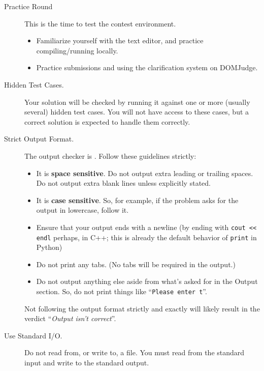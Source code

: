 \begin{description}

\item[Practice Round] This is the time to test the contest environment.
\begin{itemize}
    \item Familiarize yourself with the text editor, and practice compiling/running locally.
    \item Practice submissions and using the clarification system on DOMJudge.
\end{itemize}

\item[Hidden Test Cases.]
Your solution will be checked by running it against one or more (usually several) hidden test cases. You will not have access to these cases, but a correct solution is expected to handle them correctly.

\item[Strict Output Format.]
The output checker is {}. Follow these guidelines strictly:

\begin{itemize}
    \item It is \textbf{space sensitive}. Do not output extra leading or trailing spaces. Do not output extra blank lines unless explicitly stated.
    \item It is \textbf{case sensitive}. So, for example, if the problem asks for the output in lowercase, follow it.
    \item Ensure that your output ends with a newline (by ending with \verb|cout << endl| perhaps, in C++; this is already the default behavior of \verb|print| in Python)
    \item Do not print any tabs. (No tabs will be required in the output.)
    \item Do not output anything else aside from what's asked for in the Output section. So, do not print things like ``\texttt{Please enter t}''. 
\end{itemize}

Not following the output format strictly and exactly will likely result in the verdict ``\textit{Output isn't correct}''.

\item[Use Standard I/O.]
Do not read from, or write to, a file. You must read from the standard input and write to the standard output.


\end{description}
